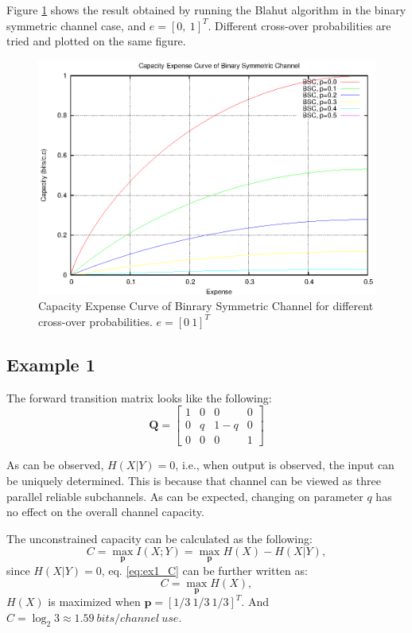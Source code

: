 \documentclass[a4paper,10pt]{article}
\begin{document}
Figure \ref{fig:bsc_cap} shows the result obtained by running the Blahut algorithm in the binary symmetric channel case, and $e=[0,\ 1]^T$. Different cross-over probabilities are tried and plotted on the same figure.
\begin{figure}
 \centering
 \includegraphics[bb=50 50 410 302]{pic/bsc_cap.eps}
 \caption{Capacity Expense Curve of Binrary Symmetric Channel for different cross-over probabilities. $e=[0\ 1]^T$}
 \label{fig:bsc_cap}
\end{figure}

\subsection{Example 1}
The forward transition matrix looks like the following:
\[
 \mathbf{Q} = \left[ 
\begin{array}{cccc}
1 & 0 & 0 & 0 \\ 
0 & q & 1-q & 0 \\ 
0 & 0 & 0 & 1
\end{array}\right] 
\]

As can be observed, $H(X|Y)=0$, i.e., when output is observed, the input can be uniquely determined. This is because that channel can be viewed as three parallel reliable subchannels. As can be expected, changing on parameter $q$ has no effect on the overall channel capacity.

The unconstrained capacity can be calculated as the following:
\begin{equation}
 C=\max_{\mathbf{p}} {I(X;Y)}=\max_{\mathbf{p}} {H(X)-H(X|Y)},
\label{eq:ex1_C}
\end{equation}
since $H(X|Y)=0$, eq. \ref{eq:ex1_C} can be further written as:
\begin{equation}
 C=\max_{\mathbf{p}}{H(X)},
\end{equation}
$H(X)$ is maximized when $\mathbf{p}=[1/3\ 1/3\ 1/3]^T$. And $C=\log_2{3}\approx1.59\ bits/channel\ use$.
\end{document}
